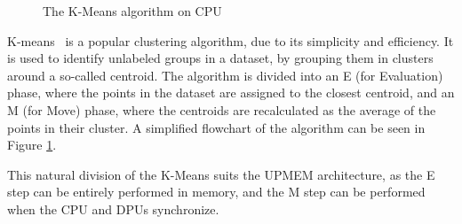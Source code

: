 \begin{figure}
    \centering
    \caption{\label{fig:KMeansCPU}The K-Means algorithm on CPU}
\end{figure}

K-means~\cite{Lloyd82leastsquares} is a popular clustering algorithm, due to its simplicity and efficiency. It is used to identify unlabeled groups in a dataset, by grouping them in clusters around a so-called centroid. The algorithm is divided into an E (for Evaluation) phase, where the points in the dataset are assigned to the closest centroid, and an M (for Move) phase, where the centroids are recalculated as the average of the points in their cluster. A simplified flowchart of the algorithm can be seen in Figure \ref{fig:KMeansCPU}.

This natural division of the K-Means suits the UPMEM architecture, as the E step can be entirely performed in memory, and the M step can be performed when the CPU and DPUs synchronize.

